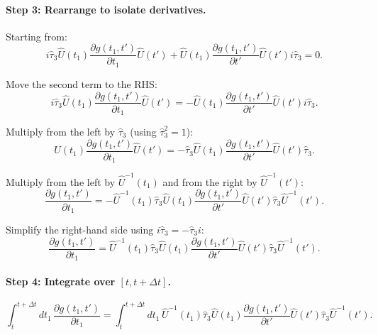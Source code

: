 \documentclass[11pt]{article}
\begin{document}
\paragraph{Step 3: Rearrange to isolate derivatives.}

Starting from:
\begin{equation}
i\hat{\tau}_3 \hat{U}(t_1) \frac{\partial g(t_1, t')}{\partial t_1} \hat{U}(t') + \hat{U}(t_1) \frac{\partial g(t_1, t')}{\partial t'} \hat{U}(t') i\hat{\tau}_3 = 0.
\end{equation}

Move the second term to the RHS:
\begin{equation}
i\hat{\tau}_3 \hat{U}(t_1) \frac{\partial g(t_1, t')}{\partial t_1} \hat{U}(t') = -\hat{U}(t_1) \frac{\partial g(t_1, t')}{\partial t'} \hat{U}(t') i\hat{\tau}_3.
\end{equation}

Multiply from the left by $\hat{\tau}_3$ (using $\hat{\tau}_3^2 = 1$):
\begin{equation}
\hat{U}(t_1) \frac{\partial g(t_1, t')}{\partial t_1} \hat{U}(t') = -\hat{\tau}_3 \hat{U}(t_1) \frac{\partial g(t_1, t')}{\partial t'} \hat{U}(t') \hat{\tau}_3.
\end{equation}

Multiply from the left by $\hat{U}^{-1}(t_1)$ and from the right by $\hat{U}^{-1}(t')$:
\begin{equation}
\frac{\partial g(t_1, t')}{\partial t_1} = -\hat{U}^{-1}(t_1) \hat{\tau}_3 \hat{U}(t_1) \frac{\partial g(t_1, t')}{\partial t'} \hat{U}(t') \hat{\tau}_3 \hat{U}^{-1}(t').
\end{equation}

Simplify the right-hand side using $i\hat{\tau}_3 = -\hat{\tau}_3 i$:
\begin{equation}
\frac{\partial g(t_1, t')}{\partial t_1} = \hat{U}^{-1}(t_1) \hat{\tau}_3 \hat{U}(t_1) \frac{\partial g(t_1, t')}{\partial t'} \hat{U}(t') \hat{\tau}_3 \hat{U}^{-1}(t').
\end{equation}

\paragraph{Step 4: Integrate over $[t, t+\Delta t]$.}

\begin{equation}
\int_t^{t+\Delta t} dt_1 \, \frac{\partial g(t_1, t')}{\partial t_1} = \int_t^{t+\Delta t} dt_1 \, \hat{U}^{-1}(t_1) \hat{\tau}_3 \hat{U}(t_1) \frac{\partial g(t_1, t')}{\partial t'} \hat{U}(t') \hat{\tau}_3 \hat{U}^{-1}(t').
\end{equation}
\end{document}
